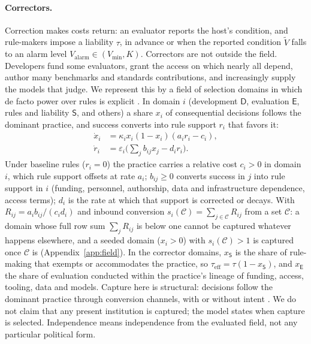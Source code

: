 \documentclass[letterpaper]{article} %
\theoremstyle{definition}
\newcommand{\dD}{\mathsf{D}}
\newcommand{\dE}{\mathsf{E}}
\newcommand{\dS}{\mathsf{S}}
\newcommand{\cC}{\mathcal{C}}
\newcommand{\Valarm}{V_{\mathrm{alarm}}}
\newcommand{\Vmin}{V_{\min}}
\newcommand{\taueff}{\tau_{\mathrm{eff}}}
\begin{document}
\paragraph{Correctors.} Correction makes costs return: an evaluator reports the host's condition, and rule-makers impose a liability $\tau$, in advance or when the reported condition $\tilde V$ falls to an alarm level $\Valarm\in(\Vmin,K)$. Correctors are not outside the field. Developers fund some evaluators, grant the access on which nearly all depend, author many benchmarks and standards contributions, and increasingly supply the models that judge. We represent this by a field of selection domains in which de facto power over rules is explicit \citep{acemoglu2008}. In domain $i$ (development $\dD$, evaluation $\dE$, rules and liability $\dS$, and others) a share $x_i$ of consequential decisions follows the dominant practice, and success converts into rule support $r_i$ that favors it:
\begin{align}
\dot x_i&=\kappa_ix_i(1-x_i)(a_ir_i-c_i),\label{eq:x}\\
\dot r_i&=\varepsilon_i\Big(\textstyle\sum_jb_{ij}x_j-d_ir_i\Big).\label{eq:r}
\end{align}
Under baseline rules ($r_i=0$) the practice carries a relative cost $c_i>0$ in domain $i$, which rule support offsets at rate $a_i$; $b_{ij}\ge0$ converts success in $j$ into rule support in $i$ (funding, personnel, authorship, data and infrastructure dependence, access terms); $d_i$ is the rate at which that support is corrected or decays. With $R_{ij}=a_ib_{ij}/(c_id_i)$ and inbound conversion $s_i(\cC)=\sum_{j\in\cC}R_{ij}$ from a set $\cC$: a domain whose full row sum $\sum_jR_{ij}$ is below one cannot be captured whatever happens elsewhere, and a seeded domain ($x_i>0$) with $s_i(\cC)>1$ is captured once $\cC$ is (Appendix~\ref{app:field}). In the corrector domains, $x_\dS$ is the share of rule-making that exempts or accommodates the practice, so $\taueff=\tau(1-x_\dS)$, and $x_\dE$ the share of evaluation conducted within the practice's lineage of funding, access, tooling, data and models. Capture here is structural: decisions follow the dominant practice through conversion channels, with or without intent \citep{kwak2014}. We do not claim that any present institution is captured; the model states when capture is selected. Independence means independence from the evaluated field, not any particular political form.
\end{document}
